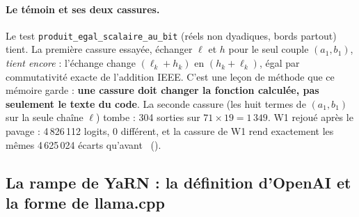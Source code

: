 \paragraph{Le témoin et ses deux cassures.} Le test \texttt{produit\_egal\_scalaire\_au\_bit} (réels non dyadiques, bords partout) tient. La première cassure essayée, échanger $\ell$ et $h$ pour le seul couple $(a_1, b_1)$, \emph{tient encore} : l'échange change $(\ell_k + h_k)$ en $(h_k + \ell_k)$, égal par commutativité exacte de l'addition IEEE. C'est une leçon de méthode que ce mémoire garde : \textbf{une cassure doit changer la fonction calculée, pas seulement le texte du code}. La seconde cassure (les huit termes de $(a_1, b_1)$ sur la seule chaîne $\ell$) tombe : 304 sorties sur $71 \times 19 = 1\,349$. W1 rejoué après le pavage : 4\,826\,112 logits, 0 différent, et la cassure de W1 rend exactement les mêmes 4\,625\,024 écarts qu'avant \mes~().

\subsection{La rampe de YaRN : la définition d'OpenAI et la forme de llama.cpp}\label{sec:t2r-yarn}

